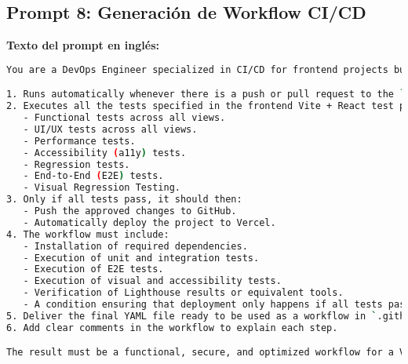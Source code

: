 \documentclass[12pt,a4paper]{article}
\begin{document}
\subsection{Prompt 8: Generación de Workflow CI/CD}

\textbf{Texto del prompt en inglés:}
\begin{lstlisting}[language=bash]
You are a DevOps Engineer specialized in CI/CD for frontend projects built with Vite + React. Your task is to generate a complete workflow using GitHub Actions that:

1. Runs automatically whenever there is a push or pull request to the `main` branch.
2. Executes all the tests specified in the frontend Vite + React test plan, including:
   - Functional tests across all views.
   - UI/UX tests across all views.
   - Performance tests.
   - Accessibility (a11y) tests.
   - Regression tests.
   - End-to-End (E2E) tests.
   - Visual Regression Testing.
3. Only if all tests pass, it should then:
   - Push the approved changes to GitHub.
   - Automatically deploy the project to Vercel.
4. The workflow must include:
   - Installation of required dependencies.
   - Execution of unit and integration tests.
   - Execution of E2E tests.
   - Execution of visual and accessibility tests.
   - Verification of Lighthouse results or equivalent tools.
   - A condition ensuring that deployment only happens if all tests pass.
5. Deliver the final YAML file ready to be used as a workflow in `.github/workflows/ci-cd.yml`.
6. Add clear comments in the workflow to explain each step.

The result must be a functional, secure, and optimized workflow for a Vite + React frontend project, following best practices for CI/CD and automated testing.
\end{lstlisting}
\end{document}
